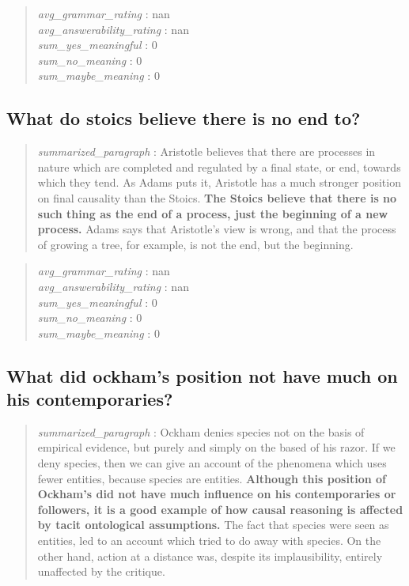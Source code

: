 \begin{quote}
\emph{avg\_grammar\_rating} : nan\\
\emph{avg\_answerability\_rating} : nan\\
\emph{sum\_yes\_meaningful} : 0\\
\emph{sum\_no\_meaning} : 0\\
\emph{sum\_maybe\_meaning} : 0
\end{quote}

\hypertarget{what-do-stoics-believe-there-is-no-end-to}{%
\subsection{What do stoics believe there is no end
to?}\label{what-do-stoics-believe-there-is-no-end-to}}

\begin{quote}
\emph{summarized\_paragraph} : Aristotle believes that there are
processes in nature which are completed and regulated by a final state,
or end, towards which they tend. As Adams puts it, Aristotle has a much
stronger position on final causality than the Stoics. \textbf{The Stoics
believe that there is no such thing as the end of a process, just the
beginning of a new process.} Adams says that Aristotle's view is wrong,
and that the process of growing a tree, for example, is not the end, but
the beginning.
\end{quote}

\begin{quote}
\emph{avg\_grammar\_rating} : nan\\
\emph{avg\_answerability\_rating} : nan\\
\emph{sum\_yes\_meaningful} : 0\\
\emph{sum\_no\_meaning} : 0\\
\emph{sum\_maybe\_meaning} : 0
\end{quote}

\hypertarget{what-did-ockhams-position-not-have-much-on-his-contemporaries}{%
\subsection{What did ockham's position not have much on his
contemporaries?}\label{what-did-ockhams-position-not-have-much-on-his-contemporaries}}

\begin{quote}
\emph{summarized\_paragraph} : Ockham denies species not on the basis of
empirical evidence, but purely and simply on the based of his razor. If
we deny species, then we can give an account of the phenomena which uses
fewer entities, because species are entities. \textbf{Although this
position of Ockham's did not have much influence on his contemporaries
or followers, it is a good example of how causal reasoning is affected
by tacit ontological assumptions.} The fact that species were seen as
entities, led to an account which tried to do away with species. On the
other hand, action at a distance was, despite its implausibility,
entirely unaffected by the critique.
\end{quote}


